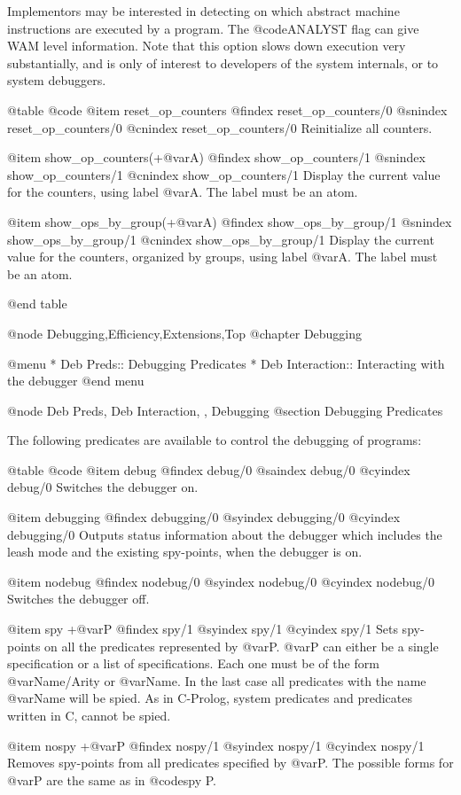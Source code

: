 {{{{{{{{Implementors may be interested in detecting on which abstract machine
instructions are executed by a program. The @code{ANALYST} flag can give
WAM level information. Note that this option slows down execution very
substantially, and is only of interest to developers of the system
internals, or to system debuggers.

@table @code
@item reset_op_counters
@findex reset_op_counters/0
@snindex reset_op_counters/0
@cnindex reset_op_counters/0
Reinitialize all counters.

@item show_op_counters(+@var{A})
@findex show_op_counters/1
@snindex show_op_counters/1
@cnindex show_op_counters/1
Display the current value for the counters, using label @var{A}. The
label must be an atom.

@item show_ops_by_group(+@var{A})
@findex show_ops_by_group/1
@snindex show_ops_by_group/1
@cnindex show_ops_by_group/1
Display the current value for the counters, organized by groups, using
label @var{A}. The label must be an atom.

@end table

@node Debugging,Efficiency,Extensions,Top 
@chapter Debugging

@menu
* Deb Preds:: Debugging Predicates
* Deb Interaction:: Interacting with the debugger
@end menu

@node Deb Preds, Deb Interaction, , Debugging
@section Debugging Predicates

The following predicates are available to control the debugging of
programs:

@table @code
@item debug
@findex debug/0
@saindex debug/0
@cyindex debug/0
Switches the debugger on.

@item debugging
@findex debugging/0
@syindex debugging/0
@cyindex debugging/0
Outputs status information about the debugger which includes the leash
mode and the existing spy-points, when the debugger is on.

@item nodebug
@findex nodebug/0
@syindex nodebug/0
@cyindex nodebug/0
Switches the debugger off.

@item spy +@var{P}
@findex spy/1
@syindex spy/1
@cyindex spy/1
 Sets spy-points on all the predicates represented by
@var{P}. @var{P} can either be a single specification or a list of 
specifications. Each one must be of the form @var{Name/Arity} 
or @var{Name}. In the last case all predicates with the name 
@var{Name} will be spied. As in C-Prolog, system predicates and 
predicates written in C, cannot be spied.

@item nospy +@var{P}
@findex nospy/1
@syindex nospy/1
@cyindex nospy/1
 Removes spy-points from all predicates specified by @var{P}.
The possible forms for @var{P} are the same as in @code{spy P}.

}}}}}}}}
